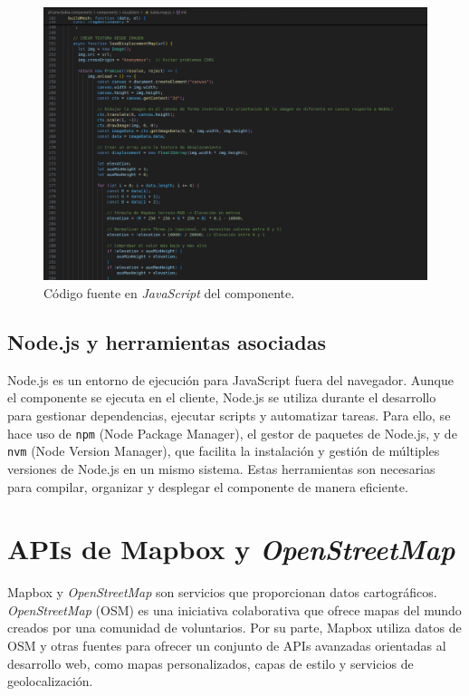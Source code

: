 \documentclass[a4paper, 12pt]{book}
\begin{document}
\begin{figure}[H]
  \centering
  \includegraphics[width=\textwidth]{img/js.png}
  \caption{Código fuente en \textit{JavaScript} del componente.}
  \label{fig:js-img}
\end{figure}


\subsection{Node.js y herramientas asociadas}
\label{sec:nodejs}

Node.js es un entorno de ejecución para JavaScript fuera del navegador. Aunque el componente se ejecuta en el cliente, Node.js se utiliza durante el desarrollo para gestionar dependencias, ejecutar scripts y automatizar tareas. Para ello, se hace uso de \texttt{npm} (Node Package Manager), el gestor de paquetes de Node.js, y de \texttt{nvm} (Node Version Manager), que facilita la instalación y gestión de múltiples versiones de Node.js en un mismo sistema. Estas herramientas son necesarias para compilar, organizar y desplegar el componente de manera eficiente.



\section{APIs de Mapbox y \textit{OpenStreetMap}}
\label{sec:apis}

Mapbox y \textit{OpenStreetMap} son servicios que proporcionan datos cartográficos. \textit{OpenStreetMap} (OSM) es una iniciativa colaborativa que ofrece mapas del mundo creados por una comunidad de voluntarios. Por su parte, Mapbox utiliza datos de OSM y otras fuentes para ofrecer un conjunto de APIs avanzadas orientadas al desarrollo web, como mapas personalizados, capas de estilo y servicios de geolocalización.
\end{document}
